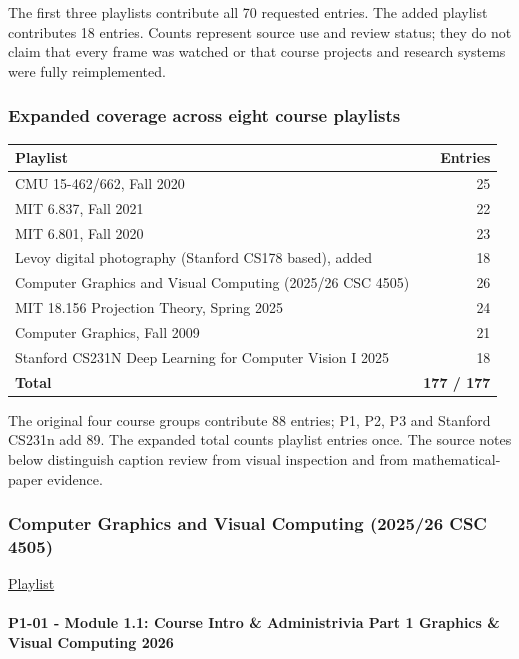 The first three playlists contribute all 70 requested entries. The added playlist contributes 18 entries. Counts represent source use and review status; they do not claim that every frame was watched or that course projects and research systems were fully reimplemented.

\subsubsection{Expanded coverage across eight course playlists}\label{expanded-coverage-across-eight-course-playlists}

{\def\LTcaptype{none} %
\begin{longtable}[]{@{}lr@{}}
\toprule\noalign{}
Playlist & Entries \\
\midrule\noalign{}
\endhead
\bottomrule\noalign{}
\endlastfoot
CMU 15-462/662, Fall 2020 & 25 \\
MIT 6.837, Fall 2021 & 22 \\
MIT 6.801, Fall 2020 & 23 \\
Levoy digital photography (Stanford CS178 based), added & 18 \\
Computer Graphics and Visual Computing (2025/26 CSC 4505) & 26 \\
MIT 18.156 Projection Theory, Spring 2025 & 24 \\
Computer Graphics, Fall 2009 & 21 \\
Stanford CS231N Deep Learning for Computer Vision I 2025 & 18 \\
\textbf{Total} & \textbf{177 / 177} \\
\end{longtable}
}

The original four course groups contribute 88 entries; P1, P2, P3 and Stanford CS231n add 89. The expanded total counts playlist entries once. The source notes below distinguish caption review from visual inspection and from mathematical-paper evidence.

\subsubsection{Computer Graphics and Visual Computing (2025/26 CSC 4505)}\label{computer-graphics-and-visual-computing-202526-csc-4505}

\href{https://www.youtube.com/playlist?list=PLubb3AIPdPhYu-auUzK10YzvERCshyQ9M}{Playlist}

\paragraph{P1-01 - Module 1.1: Course Intro \& Administrivia Part 1 Graphics \& Visual Computing 2026}\label{p1-01---module-1.1-course-intro-administrivia-part-1-graphics-visual-computing-2026}

